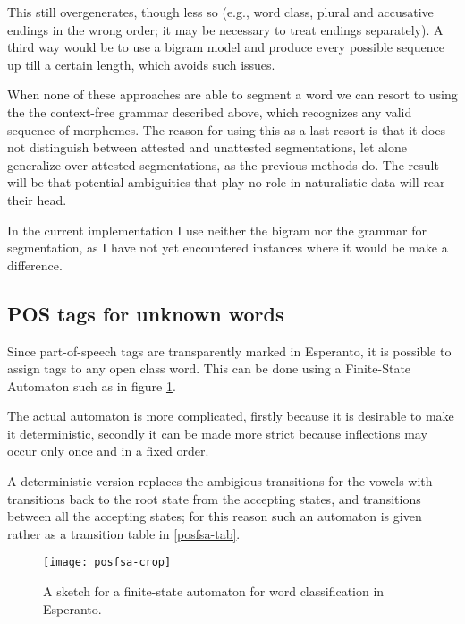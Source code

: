 \documentclass[10pt,a4paper]{article}
\begin{document}
This still overgenerates, though less so (e.g., word class, plural and
accusative endings in the wrong order; it may be necessary to treat endings
separately). A third way would be to use a bigram model and produce every
possible sequence up till a certain length, which avoids such issues.

When none of these approaches are able to segment a word we can resort to
using the the context-free grammar described above, which recognizes any valid
sequence of morphemes. The reason for using this as a last resort is that it
does not distinguish between attested and unattested segmentations, let alone
generalize over attested segmentations, as the previous methods do. The result
will be that potential ambiguities that play no role in naturalistic data will
rear their head.

In the current implementation I use neither the bigram nor the grammar for
segmentation, as I have not yet encountered instances where it would be
make a difference.

\subsection{POS tags for unknown words}

Since part-of-speech tags are transparently marked in Esperanto, it is
possible to assign tags to any open class word. This can be done using a
Finite-State Automaton such as in figure \ref{posfsa}.

The actual automaton is more complicated, firstly because it is
desirable to make it deterministic, secondly it can be made more strict because
inflections may occur only once and in a fixed order.

A deterministic version replaces the ambigious transitions for the vowels with
transitions back to the root state from the accepting states, and transitions
between all the accepting states; for this reason such an automaton is given rather as
a transition table in \ref{posfsa-tab}.

\begin{figure}
\centering
\texttt{[image: posfsa-crop]}
\caption{A sketch for a finite-state automaton for word classification in
Esperanto.}
\label{posfsa}
\end{figure}
\end{document}
